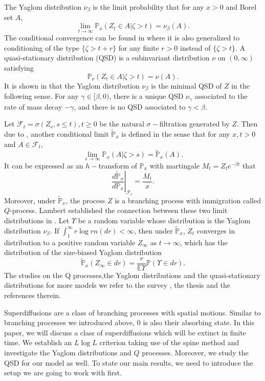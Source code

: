 \documentclass[12pt,a4paper]{amsart}
\theoremstyle{plain}
\theoremstyle{definition}
\numberwithin{equation}{section}
\begin{document}
The Yaglom distribution $\nu_{\beta}$ is the limit probability that for any
$x>0$ and Borel set $A$,
\[
	\lim_{t\rightarrow\infty}\mathbb P_x(Z_t\in A\big|\zeta>t)=\nu_{\beta}(A).
\]
The conditional convergence can be found in \cite{Li2000Asymptotic} where it is
also generalized to conditioning of the type $\{\zeta>t+r\}$ for any finite
$r>0$ instead of $\{\zeta>t\}$. A quasi-stationary distribution (QSD) is a
subinvariant distribution $\nu$ on $(0,\infty)$ satisfying
\[
	\mathbb P_{\nu}(Z_t\in A|\zeta>t)=\nu(A).
\]
It is shown in \cite{Lambert2007Quasi-stationary} that the Yaglom distribution
$\nu_{\beta}$ is the minimal QSD of $Z$ in the following sense. For any
$\gamma\in[\beta,0)$, there is a unique QSD $\nu_{\gamma}$ associated to the
rate of mass decay $-\gamma$, and there is no QSD associated to $\gamma<\beta$.


Let $\mathcal F_t=\sigma(Z_s,s\leq t), t\geq 0$ be the natural
$\sigma-$filtration generated by $Z$. Then due to
\cite{RenSongZhang2018Williams}, another conditional limit $\widetilde{\mathbb
  P}_x$ is defined in the sense that for any $x,t>0$ and $A\in\mathcal F_t$,
\[
	\lim_{s\rightarrow\infty}\mathbb P_x(A\big|\zeta>s)=\widetilde{\mathbb P}_x(A).
\]
It can be expressed as an $h-$transform of $\mathbb P_x$ with martingale
$M_t=Z_te^{-\beta t}$ that
\[
	\left.\dfrac{d\widetilde{\mathbb P}_x}{d\mathbb P_x}\right|_{\mathcal F_t}=\frac{M_t}{x}.
\]
Moreover, under $\widetilde{\mathbb P}_x$, the process $Z$ is a branching
process with immigration called $Q$-process. Lambert established the connection
between these two limit distributions in \cite{Lambert2007Quasi-stationary}. Let
$\Upsilon$ be a random variable whose distribution is the Yaglom distribution
$\nu_\beta$. If $\int_1^\infty r\log r n(dr)<\infty$, then under
$\widetilde{\mathbb P}_x$, $Z_t$ converges in distribution to a positive random
variable $Z_\infty$ as $t\to\infty$, which has the distribution of the
size-biased Yaglom distribution
\[
	\widetilde{\mathbb P}_x(Z_\infty\in dr)=\frac{r}{\mathbb E\Upsilon}\mathbb P(\Upsilon\in dr).
\]
The studies on the Q processes,the Yaglom distributions and the quasi-stationary
distributions for more models we refer to the survey
\cite{MeleardVillemonais2012Quasi-stationary}, the thesis
\cite{Penisson2010Conditional} and the references therein.

Superdiffusions are a class of branching processes with spatial motions. Similar
to branching processes we introduced above, $0$ is also their absorbing state.
In this paper, we will discuss a class of superdiffusions which will be extinct
in finite time. We establish an $L\log L$ criterion taking use of the spine
method and investigate the Yaglom distributions and $Q$ processes. Moreover, we
study the QSD for our model as well. To state our main results, we need to
introduce the setup we are going to work with first.
\end{document}
